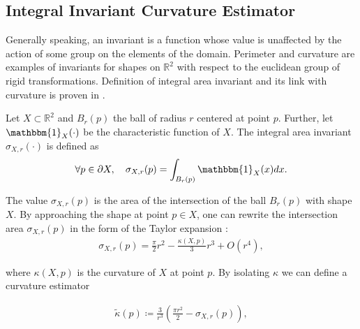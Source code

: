 \documentclass[smallextended]{svjour3}       %
\begin{document}
\subsection{Integral Invariant Curvature Estimator}
Generally speaking, an invariant is a function whose value is unaffected by the action
of some group on the elements of the domain.
Perimeter and curvature are examples of invariants for shapes on
$\mathbb{R}^2$ with respect to the euclidean group of rigid
transformations. Definition of integral area invariant and its link
with curvature is proven in \cite{manay04intinvariant}.


\begin{definition}
  Let $X \subset \mathbb{R}^2$ and $B_r(p)$ the ball of radius $r$ centered at point $p$. Further, let
  $\mathbbm{1}_X(\cdot)$ be the characteristic function of $X$. The integral area invariant $\sigma_{X,r}(\cdot)$ is
  defined as
  \begin{align*}
    \forall p \in \partial X, \quad \sigma_{X,r}(p) = \int_{B_r(p)}{ \mathbbm{1}_X(x) dx}.
  \end{align*}
\end{definition}


The value $\sigma_{X,r}(p)$ is the area of the intersection of the
ball $B_r(p)$ with shape $X$. By approaching the shape at
point $p \in X$, one can rewrite the intersection area
$\sigma_{X,r}(p)$ in the form of the Taylor expansion
\cite{pottman09intinvariant}:
\begin{align*}
  \sigma_{X,r}(p) = \frac{\pi}{2}r^2 - \frac{\kappa(X,p)}{3}r^3 + O(r^4),
\end{align*}
		
where $\kappa(X,p)$ is the curvature of $X$ at point $p$. By isolating $\kappa$ we can define a curvature estimator
	
\begin{align}
  \tilde{\kappa}(p) \coloneqq \frac{3}{r^3}\left( \frac{\pi r^2}{2} - \sigma_{X,r}(p) \right),
  \label{eq:curvature_approximation}
\end{align}
	
\end{document}
